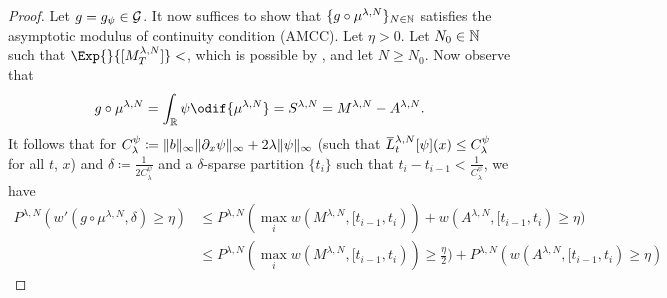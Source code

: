 \begin{proof}
  Let \(g = g_\psi \in \mathcal{G}\).
  It now suffices to show that \(\{g \circ \mu^{\lambda, N}\}_{N\in\mathbb{N}}\) satisfies the asymptotic modulus of continuity condition (AMCC).
  Let \(\eta > 0\).
  Let \(N_0 \in \mathbb{N}\) such that \(\Exp{}{[M_T^{\lambda, N}]} < \), which is possible by , and let \(N \geq N_0\).
  Now observe that
  \begin{equation}
    g \circ \mu^{\lambda, N} = \int_\potspace \psi \odif{\mu^{\lambda, N}} = S^{\lambda, N} = M^{\lambda, N} - A^{\lambda, N}.
  \end{equation}
  It follows that for \(C_\lambda^\psi \coloneqq \lVert b\rVert_\infty \lVert\partial_x \psi\rVert_\infty + 2\lambda \lVert\psi\rVert_\infty\) (such that \(\ol{L}^{\lambda,N}_t [\psi] (x) \leq C_\lambda^\psi\) for all \(t\), \(x\)) and \(\delta \coloneqq \frac{1}{2C_\lambda^\psi}\) and a \( \delta \)-sparse partition \(\{t_i\}\) such that \(t_i - t_{i-1} < \frac{1}{C_\lambda^\psi}\), we have
  \begin{equation}
    \begin{split}
      P^{\lambda, N} (w'(g \circ \mu^{\lambda, N}, \delta) \geq \eta)
       & \leq P^{\lambda, N}( \max_i w(M^{\lambda, N}, [t_{i-1}, t_i)) + w(A^{\lambda, N}, [t_{i-1}, t_i) \geq \eta)                                     \\
       & \leq P^{\lambda, N}( \max_i w(M^{\lambda, N}, [t_{i-1}, t_i)) \geq \frac{\eta}{2}) + P^{\lambda, N}(w(A^{\lambda, N}, [t_{i-1}, t_i) \geq \eta)
    \end{split}
  \end{equation}


\end{proof}